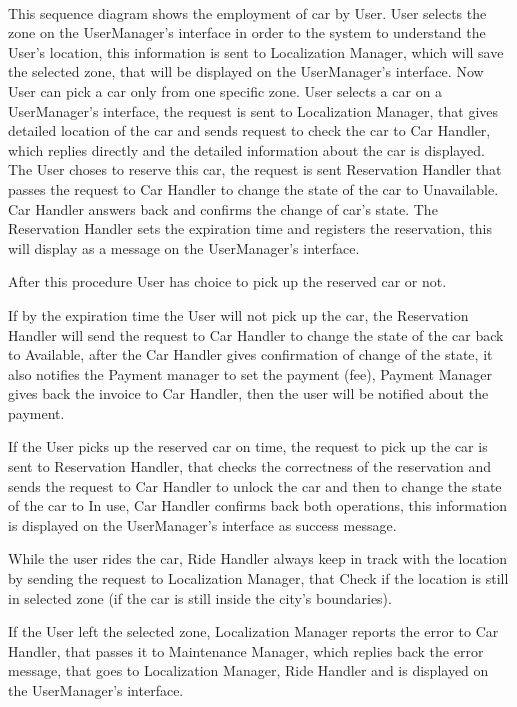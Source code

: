 		\paragraph{} This sequence diagram shows the employment of car by User.
		User selects the zone on the UserManager's interface in order to the system to understand the User's location, this information is sent to Localization Manager, which will save the selected zone, that will be displayed on the UserManager's interface. Now User can pick a car only from one specific zone. User selects a car on a UserManager's interface, the request is sent to Localization Manager, that gives detailed location of the car and sends request to check the car to Car Handler, which replies directly and the detailed information about the car is displayed. The User choses to reserve this car, the request is sent Reservation Handler that passes the request to Car Handler to change the state of the car to Unavailable. Car Handler answers back and confirms the change of car's state. The Reservation Handler sets the expiration time and registers the reservation, this will display as a message on the UserManager's interface. 
		
		After this procedure User has choice to pick up the reserved car or not.
		
		If by the expiration time the User will not pick up the car, the  Reservation Handler will send the request to Car Handler to change the state of the car back to Available, after the Car Handler gives confirmation of change of the state, it also notifies the Payment manager to set the payment (fee), Payment Manager gives back the invoice to Car Handler, then the user will be notified about the payment.   
		
		If the User picks up the reserved car on time, the request to pick up the car is sent to Reservation Handler, that checks the correctness of the reservation and sends the request to Car Handler to unlock the car and then to change the state of the car to In use, Car Handler confirms back both operations, this information is displayed on the UserManager's interface as success message.
		
		While the user rides the car, Ride Handler always keep in track with the location by sending the request to Localization Manager, that Check if the location is still in selected zone (if the car is still inside the city's boundaries). 
		
		If the User left the selected zone, Localization Manager reports the error to Car Handler, that passes it to Maintenance Manager, which replies back the error message, that goes to Localization Manager, Ride Handler and is displayed on the UserManager's interface.
		
